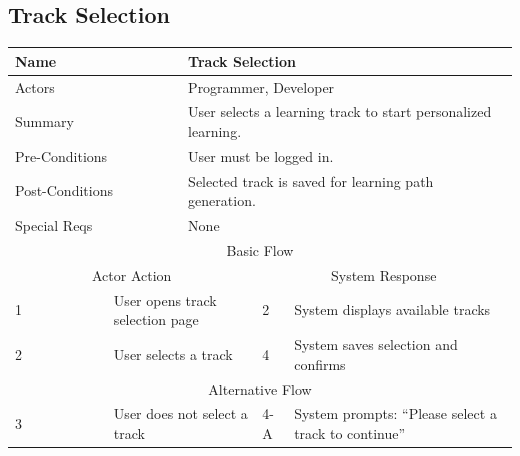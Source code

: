 \documentclass{FastFyp}
\begin{document}
\vspace{1em}

\subsection{Track Selection}
\noindent
\begin{minipage}{\textwidth}
\centering
{}
\label{tab:track}
\begin{tabular}{|p{}|p{}|p{}|p{}|p{}|}
\hline
\multicolumn{2}{|p{0.15\textwidth}|}{Name} &
  \multicolumn{3}{p{0.75\textwidth}|}{Track Selection} \\ \hline
\multicolumn{2}{|p{0.15\textwidth}|}{Actors} &
  \multicolumn{3}{p{0.75\textwidth}|}{Programmer, Developer} \\ \hline
\multicolumn{2}{|p{0.15\textwidth}|}{Summary} &
  \multicolumn{3}{p{0.75\textwidth}|}{User selects a learning track to start personalized learning.} \\ \hline
\multicolumn{2}{|p{0.15\textwidth}|}{Pre-Conditions} &
  \multicolumn{3}{p{0.75\textwidth}|}{User must be logged in.} \\ \hline
\multicolumn{2}{|p{0.15\textwidth}|}{Post-Conditions} &
  \multicolumn{3}{p{0.75\textwidth}|}{Selected track is saved for learning path generation.} \\ \hline
\multicolumn{2}{|p{0.15\textwidth}|}{Special Reqs} &
  \multicolumn{3}{p{0.75\textwidth}|}{None} \\ \hline
\multicolumn{5}{|c|}{Basic Flow} \\ \hline
\multicolumn{3}{|c|}{Actor Action} &
  \multicolumn{2}{c|}{System Response} \\ \hline
1 &
  \multicolumn{2}{p{0.42\textwidth}|}{User opens track selection page} &
  2 &
  System displays available tracks \\ \hline
2 &
  \multicolumn{2}{p{0.42\textwidth}|}{User selects a track} &
  4 &
  System saves selection and confirms \\ \hline
\multicolumn{5}{|c|}{Alternative Flow} \\ \hline
3 &
  \multicolumn{2}{p{0.42\textwidth}|}{User does not select a track} &
  4-A &
  System prompts: “Please select a track to continue” \\ \hline
\end{tabular}
\end{minipage}
\end{document}

